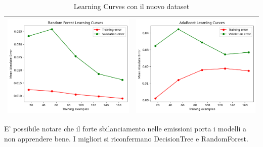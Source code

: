 \begin{table}[H]
\begin{tabularx}{\textwidth}{|X|X|}
        \includegraphics[width=\linewidth, trim=0 0 0 0]{images/RandomForestRegressor_lc2.png} &
        \includegraphics[width=\linewidth, trim=0 0 0 0]{images/AdaBoostRegressor_lc2.png} \\
        \hline
    \end{tabularx}
    \caption{Learning Curves con il nuovo dataset}
    \label{tab:emissions_info}
\end{table}

\noindent E' possibile notare che il forte sbilanciamento nelle emissioni porta i modelli a non apprendere bene. I migliori si riconfermano DecisionTree e RandomForest.

